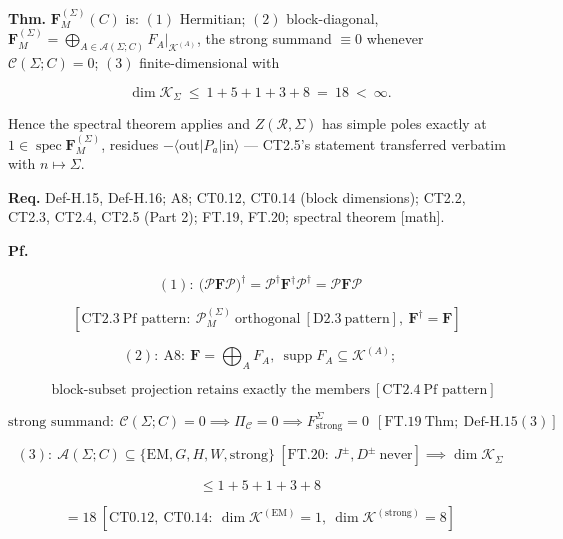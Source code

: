 \begin{theorem}\label{tag:FT-26}
\textbf{Thm.} $\mathbf F_M^{(\Sigma)}(C)$ is: $(1)$ Hermitian; $(2)$ block-diagonal, $\mathbf F_M^{(\Sigma)}=\bigoplus_{A\in\mathcal A(\Sigma;C)}F_A\big|_{\mathcal K^{(A)}}$, the strong summand $\equiv0$ whenever $\mathcal C(\Sigma;C)=0$; $(3)$ finite-dimensional with

\[
\dim\mathcal K_\Sigma\ \le\ 1+5+1+3+8\ =\ 18\ <\ \infty .
\]

Hence the spectral theorem applies and $Z(\mathcal R,\Sigma)$ has simple poles exactly at $1\in\operatorname{spec}\mathbf F_M^{(\Sigma)}$, residues $-\langle\mathrm{out}|P_a|\mathrm{in}\rangle$ — CT2.5's statement transferred verbatim with $n\mapsto\Sigma$.

\textbf{Req.} Def-H.15, Def-H.16; A8; CT0.12, CT0.14 (block dimensions); CT2.2, CT2.3, CT2.4, CT2.5 (Part 2); FT.19, FT.20; spectral theorem [math].

\textbf{Pf.}

\[
(1):\ \bigl(\mathcal P\mathbf F\mathcal P\bigr)^\dagger=\mathcal P^\dagger\mathbf F^\dagger\mathcal P^\dagger=\mathcal P\mathbf F\mathcal P
\]

\[
\quad [\mathrm{CT2.3}\ \text{Pf pattern}:\ \mathcal P_M^{(\Sigma)}\ \text{orthogonal}\ [\mathrm{D2.3}\ \text{pattern}],\ \mathbf F^\dagger=\mathbf F]
\]

\[
(2):\ \mathrm{A8}:\ \mathbf F=\bigoplus_AF_A,\ \operatorname{supp}F_A\subseteq\mathcal K^{(A)};
\]

\[
\qquad \text{block-subset projection retains exactly the members}\ [\mathrm{CT2.4}\ \text{Pf pattern}]
\]

\[
\text{strong summand}:\ \mathcal C(\Sigma;C)=0\implies\Pi_{\mathcal C}=0\implies F_{\mathrm{strong}}^\Sigma=0\ \ [\mathrm{FT.19}\ \text{Thm};\ \mathrm{Def\text{-}H.15}(3)]
\]

\[
(3):\ \mathcal A(\Sigma;C)\subseteq\{\mathrm{EM},G,H,W,\mathrm{strong}\}\ [\mathrm{FT.20}:\ J^\pm,D^\pm\ \text{never}]\implies\dim\mathcal K_\Sigma
\]

\[
\le 1+5+1+3+8
\]

\[
= 18\ [\mathrm{CT0.12},\ \mathrm{CT0.14}:\ \dim\mathcal K^{(\mathrm{EM})}=1,\ \dim\mathcal K^{(\mathrm{strong})}=8]
\]


\end{theorem}
